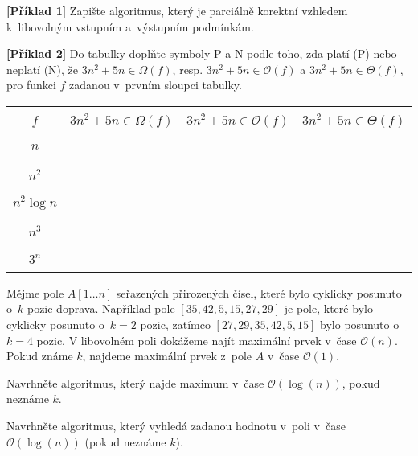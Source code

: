 \documentclass{ib002}
\begin{document}
\newcommand\N{\mathbb{N}}
\newcommand\Z{\mathbb{Z}}
\newcommand\R{\mathbb{R}}
\newcommand\bigO[1]{\mathcal{O}(#1)}

\textbf{[Příklad 1]}
Zapište algoritmus, který je parciálně korektní vzhledem k~libovolným vstupním
a~výstupním podmínkám.

\vspace{9cm}
\textbf{[Příklad 2]}
Do tabulky doplňte symboly P a N podle toho, zda platí (P) nebo neplatí (N), že
$3n^2 + 5n \in \mathit{\Omega}(f)$, resp. $3n^2 + 5n \in \bigO{f}$ a $3n^2 + 5n
\in \mathit{\Theta}(f)$, pro funkci $f$ zadanou v~prvním sloupci tabulky.

\bigskip
\begin{center}
\begin{tabular}{|c|c|c|c|}
	\hline  & & & \\[1.5ex]
	$f$ & $3n^2 + 5n \in \mathit{\Omega}(f)$
	  & $3n^2 + 5n \in \bigO{f}$
	  & $3n^2 + 5n \in \mathit{\Theta}(f)$ \\[1.5ex] 
	\hline \hline  & & & \\[1.5ex]
	$n$ & \ &\ & \\ [1.5ex] \hline & & & \\[1.5ex]
	$n^2$ & \ &\ & \\  [1.5ex] \hline & & & \\[1.5ex]
	$n^2\log n$ & \ &\ & \\[1.5ex] \hline & & & \\[1.5ex]
	$n^{3}$ & \ &\ & \\ [1.5ex] \hline & & & \\[1.5ex]
	$3^n$ & \ &\ & \\ [1.5ex] \hline %
\end{tabular}
\end{center}

\newpage
{}
Mějme pole $A[1 \dots n]$ seřazených přirozených čísel, které bylo cyklicky
posunuto o~$k$ pozic doprava. Například pole $[35, 42, 5, 15, 27, 29]$ je pole,
které bylo cyklicky posunuto o~$k = 2$ pozic, zatímco $[27, 29, 35, 42, 5, 15]$
bylo posunuto o~$k = 4$ pozic. V libovolném poli dokážeme najít maximální prvek
v~čase $\bigO{n}$. Pokud známe $k$, najdeme maximální prvek z~pole $A$ v~čase
$\bigO{1}$.
\begin{compactenum}
	\item Navrhněte algoritmus, který najde maximum v~čase $\bigO{\log(n)}$,
		pokud neznáme $k$.
	\item Navrhněte algoritmus, který vyhledá zadanou hodnotu v~poli v~čase
		$\bigO{\log(n)}$ (pokud neznáme $k$).
\end{compactenum}
\end{document}
